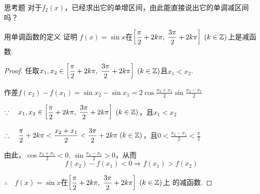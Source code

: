 \begin{thm}
    {思考题} 对于$f_2(x)$，已经求出它的单增区间，由此能直接说出它的单调减区间吗？
\end{thm}

\begin{example}
用单调函数的定义 证明 $f(x)=\sin x$在$\left[\dfrac{\pi}{2}+2k\pi,\; \dfrac{3\pi}{2}+2k\pi\right]\; (k\in\mathbb{Z})$上是减函数.
\end{example}

\begin{proof}
任取$x_1,x_2\in \left[\dfrac{\pi}{2}+2k\pi,\; \dfrac{3\pi}{2}+2k\pi\right]\; (k\in\mathbb{Z})$且$x_1<x_2$.

作差$f(x_2)-f(x_1)=\sin x_2-\sin x_1=2\cos\frac{x_2+x_1}{2}\sin\frac{x_2-x_1}{2}$

$\because\quad x_1,x_2\in \left[\dfrac{\pi}{2}+2k\pi,\; \dfrac{3\pi}{2}+2k\pi\right]\; (k\in\mathbb{Z})$，且$x_1<x_2$

$\therefore\quad \dfrac{\pi}{2}+2k\pi<\dfrac{x_2+x_1}{2}<\dfrac{3\pi}{2}+2k\pi\; (k\in\mathbb{Z})$，且$0<\frac{x_2-x_1}{2}<\frac{\pi}{2}$

由此，$\cos\frac{x_2+x_1}{2}<0$, $\sin\frac{x_2-x_1}{2}>0$，从而
\[f(x_2)-f(x_1)<0\Longrightarrow f(x_1)>f(x_2)\]

$\therefore\quad f(x)=\sin x$在$\left[\dfrac{\pi}{2}+2k\pi,\; \dfrac{3\pi}{2}+2k\pi\right]\; (k\in\mathbb{Z})$上
的减函数.
\end{proof}

